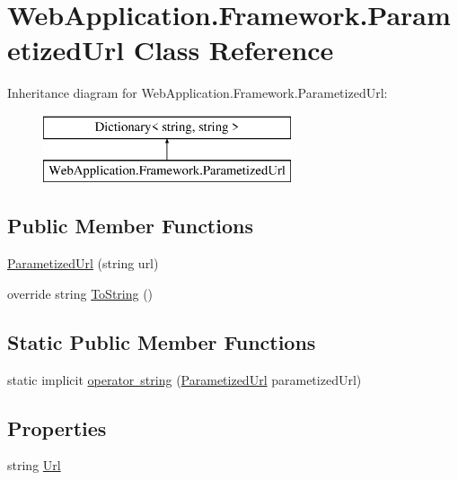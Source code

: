 \hypertarget{classWebApplication_1_1Framework_1_1ParametizedUrl}{}\section{Web\+Application.\+Framework.\+Parametized\+Url Class Reference}
\label{classWebApplication_1_1Framework_1_1ParametizedUrl}
Inheritance diagram for Web\+Application.\+Framework.\+Parametized\+Url\+:\begin{figure}[H]
\begin{center}
\leavevmode
\includegraphics[height=2.000000cm]{dd/d14/classWebApplication_1_1Framework_1_1ParametizedUrl}
\end{center}
\end{figure}
\subsection*{Public Member Functions}
\begin{DoxyCompactItemize}
\item 
\mbox{\hyperlink{classWebApplication_1_1Framework_1_1ParametizedUrl_a19e00b2b069f2adc1bf0a0e97bebddf1}{Parametized\+Url}} (string url)
\item 
override string \mbox{\hyperlink{classWebApplication_1_1Framework_1_1ParametizedUrl_a683634894d4a0b4afea0ce3054d5e035}{To\+String}} ()
\end{DoxyCompactItemize}
\subsection*{Static Public Member Functions}
\begin{DoxyCompactItemize}
\item 
static implicit \mbox{\hyperlink{classWebApplication_1_1Framework_1_1ParametizedUrl_af6af94dd3817a203be629e5703f2e588}{operator string}} (\mbox{\hyperlink{classWebApplication_1_1Framework_1_1ParametizedUrl}{Parametized\+Url}} parametized\+Url)
\end{DoxyCompactItemize}
\subsection*{Properties}
\begin{DoxyCompactItemize}
\item 
string \mbox{\hyperlink{classWebApplication_1_1Framework_1_1ParametizedUrl_a34be3576c697a64fb6dcc2cc00cb799c}{Url}}
\end{DoxyCompactItemize}


